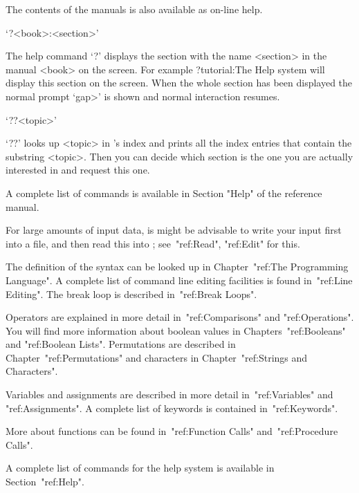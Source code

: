 
The contents of the {\GAP} manuals is also available as on-line help.

`?<book>:<section>'

The help command `?' displays the section  with the name <section> in the
manual <book> on the screen.  For example
\begintt
    ?tutorial:The Help system
\endtt
will display this section on the screen.  When the whole section has been
displayed  the normal {\GAP}  prompt  `gap>' is  shown and normal  {\GAP}
interaction resumes.

`??<topic>'

`??' looks up <topic> in {\GAP}'s index and prints  all the index entries
that contain the substring <topic>.  Then you can decide which section is
the one you are actually interested in and request this one.

A complete   list  of commands is   available  in Section  "Help" of  the
reference manual.

\null

For large amounts of input data, is might be advisable to write your
input first into a file, and then read this into {\GAP};
see~"ref:Read", "ref:Edit" for this.

The definition of the {\GAP} syntax can be looked up in
Chapter~"ref:The Programming Language".
A complete list of command line editing facilities is found
in~"ref:Line Editing".
The break loop is described in~"ref:Break Loops".

Operators are explained in more detail in~"ref:Comparisons" and
"ref:Operations".
You will find more information about boolean values in
Chapters~"ref:Booleans" and "ref:Boolean Lists".
Permutations are described in Chapter~"ref:Permutations" and characters
in Chapter~"ref:Strings and Characters".

Variables and assignments are described in more detail in~"ref:Variables"
and "ref:Assignments".
A complete list of keywords is contained in~"ref:Keywords".

More about functions can be found in~"ref:Function Calls"
and~"ref:Procedure Calls".

A complete list of commands for the help system is available in
Section~"ref:Help".

